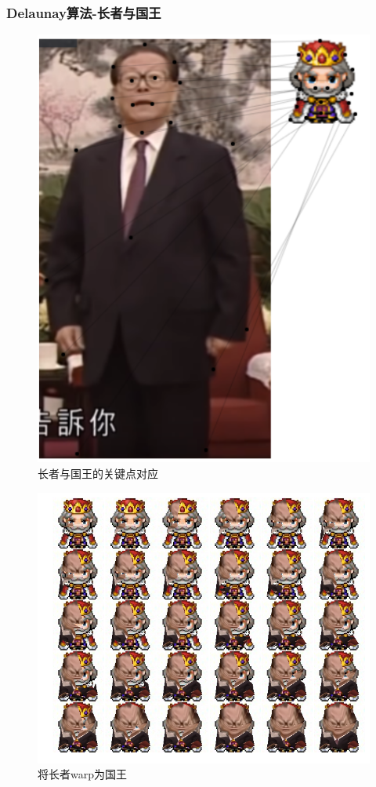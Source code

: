 \documentclass{beamer}
\begin{document}
\begin{frame}

\frametitle{Delaunay算法-长者与国王}

\begin{figure}[htb]
    \centering
    \includegraphics[width=0.4\linewidth]{map.png}
    \caption{长者与国王的关键点对应}
    \label{fig:map}
\end{figure}

\end{frame}

\begin{frame}

\begin{figure}[htb]
    \includegraphics[width=0.6\linewidth]{tri_elder2king.png}
    \caption{将长者warp为国王}
    \label{fig:elder2king}
\end{figure}

\end{frame}
\end{document}

